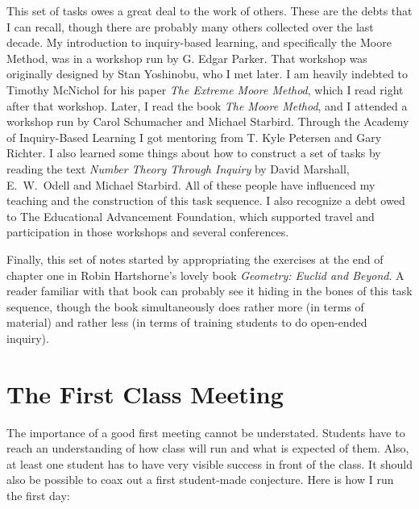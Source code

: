 \begin{annotation}
This set of tasks owes a great deal to the work of others. These are the debts that I can recall, though there are probably many others collected over the last decade.
My introduction to inquiry-based learning, and specifically the Moore Method, was in a workshop run by G. Edgar Parker. That workshop was originally designed by Stan Yoshinobu, who I met later. I am heavily indebted to Timothy McNichol for his paper \emph{The Extreme Moore Method}\cite{mcnichol}, which I read right after that workshop. Later, I read the book \emph{The Moore Method}\cite{cmmp}, and I attended a workshop run by Carol Schumacher and Michael Starbird. Through the Academy of Inquiry-Based Learning I got mentoring from T. Kyle Petersen and Gary Richter. I also learned some things about how to construct a set of tasks by reading the text
\emph{Number Theory Through Inquiry}\cite{nothy} by David Marshall, E.~W.~Odell and Michael Starbird.
All of these people have influenced my teaching and the construction of this task sequence. I also recognize a debt owed to The Educational Advancement Foundation, which supported travel and participation in those workshops and several conferences.

Finally, this set of notes started by appropriating the exercises at the end of chapter one in Robin Hartshorne's lovely book \emph{Geometry: Euclid and Beyond}\cite{hartshorne}. A reader familiar with that book can probably see it hiding in the bones of this task sequence, though the book simultaneously does rather more (in terms of material) and rather less (in terms of training students to do open-ended inquiry).


\section*{The First Class Meeting}

The importance of a good first meeting cannot be understated.
Students have to reach an understanding of how class will run and what is expected of them.
Also, at least one student has to have very visible success in front of the class.
It should also be possible to coax out a first student-made conjecture.
Here is how I run the first day:\\[.1in]


\end{annotation}
